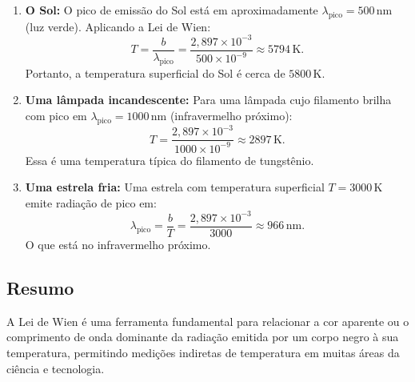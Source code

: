 \documentclass[a4paper,12pt]{article}
\begin{document}
\begin{enumerate}
    \item \textbf{O Sol:}  
    O pico de emissão do Sol está em aproximadamente \( \lambda_{\text{pico}} = 500\,\mathrm{nm} \) (luz verde). Aplicando a Lei de Wien:
    \[
    T = \frac{b}{\lambda_{\text{pico}}} = \frac{2,897 \times 10^{-3}}{500 \times 10^{-9}} \approx 5794\,\mathrm{K}.
    \]
    Portanto, a temperatura superficial do Sol é cerca de \( 5800\,\mathrm{K} \).

    \item \textbf{Uma lâmpada incandescente:}  
    Para uma lâmpada cujo filamento brilha com pico em \( \lambda_{\text{pico}} = 1000\,\mathrm{nm} \) (infravermelho próximo):
    \[
    T = \frac{2,897 \times 10^{-3}}{1000 \times 10^{-9}} \approx 2897\,\mathrm{K}.
    \]
    Essa é uma temperatura típica do filamento de tungstênio.

    \item \textbf{Uma estrela fria:}  
    Uma estrela com temperatura superficial \( T = 3000\,\mathrm{K} \) emite radiação de pico em:
    \[
    \lambda_{\text{pico}} = \frac{b}{T} = \frac{2,897 \times 10^{-3}}{3000} \approx 966\,\mathrm{nm}.
    \]
    O que está no infravermelho próximo.
\end{enumerate}

\subsection*{Resumo}

A Lei de Wien é uma ferramenta fundamental para relacionar a cor aparente ou o comprimento de onda dominante da radiação emitida por 
um corpo negro à sua temperatura, permitindo medições indiretas de temperatura em muitas áreas da ciência e tecnologia.
\end{document}
